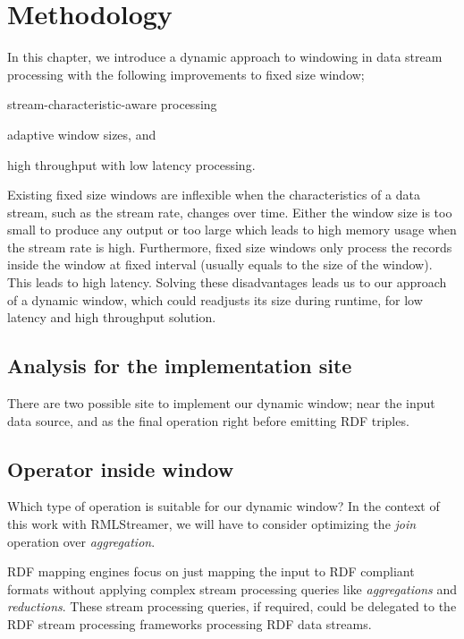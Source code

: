 \chapter{Methodology}%
\label{chap:Methodology}


In this chapter, we introduce a dynamic approach to windowing in data stream processing 
with the following improvements to fixed size window; 
\begin{enumerate*}[label=(\alph*)]
    \item stream-characteristic-aware processing 
    \item adaptive window sizes, and 
    \item high throughput with low latency processing. 
\end{enumerate*}

Existing fixed size windows are inflexible when the characteristics of a data stream,  
such as the stream rate, changes over time. Either the window size is 
too small to produce any output or too large which leads to high memory usage when 
the stream rate is high. Furthermore, fixed size windows only process the 
records inside the window at fixed interval (usually equals to the size of the window). 
This leads to high latency. Solving these disadvantages leads us to our approach 
of a dynamic window, which could readjusts its size during runtime,
for low latency and high throughput solution. 





\section{Analysis for the implementation site}
\label{sec:analysis implementation site}
There are two possible site to implement our dynamic window; 
near the input data source, and as the final operation right before 
emitting RDF triples.  


\section{Operator inside window}
\label{sec:Operator inside window}
Which type of operation is suitable for our dynamic window? 
In the context of this work with RMLStreamer, we will have to consider optimizing the 
\emph{join} operation over \emph{aggregation}. 

RDF mapping engines focus 
on just mapping the input to RDF compliant formats without 
applying complex stream processing queries like \emph{aggregations} and 
\emph{reductions}. These stream processing queries, if required, could be 
delegated to the RDF stream processing frameworks processing RDF data streams.

